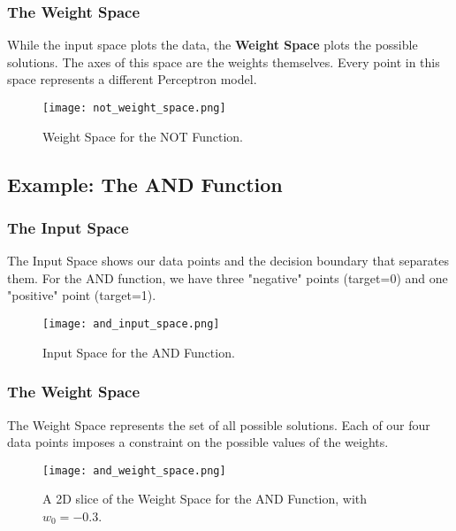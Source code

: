 \subsubsection{The Weight Space}
While the input space plots the data, the \textbf{Weight Space} plots the possible solutions. The axes of this space are the weights themselves. Every point in this space represents a different Perceptron model.
\begin{figure}[h!]
\centering
\texttt{[image: not\_weight\_space.png]}
\caption{Weight Space for the NOT Function.}
\end{figure}

\subsection{Example: The AND Function}
\subsubsection{The Input Space}
The Input Space shows our data points and the decision boundary that separates them. For the AND function, we have three "negative" points (target=0) and one "positive" point (target=1).
\begin{figure}[h!]
\centering
\texttt{[image: and\_input\_space.png]}
\caption{Input Space for the AND Function.}
\end{figure}

\subsubsection{The Weight Space}
The Weight Space represents the set of all possible solutions. Each of our four data points imposes a constraint on the possible values of the weights.
\begin{figure}[h!]
\centering
\texttt{[image: and\_weight\_space.png]}
\caption{A 2D slice of the Weight Space for the AND Function, with \(w_0 = -0.3\).}
\end{figure}


